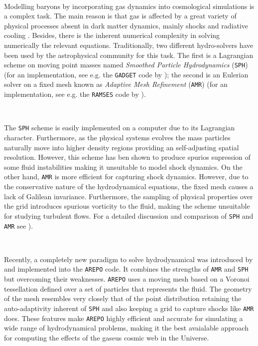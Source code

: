 \documentclass[a4,useAMS,usenatbib,usegraphicx,12pt]{article}
\begin{document}
\

Modelling baryons by incorporating gas dynamics into cosmological
simulations is a complex task. The main reason is that gas is
affected by a great variety of physical processes absent in dark
matter dynamics, mainly shocks and radiative cooling
\citep{Bond93}. Besides, there is the inherent numerical complexity in
solving numerically the relevant equations. Traditionally, two
different hydro-solvers have been used by the astrophysical community
for this task. The first is a Lagrangian scheme on moving point masses
named \textit{Smoothed
  Particle Hydrodynamics} (\texttt{SPH}) \citep{Monaghan92} (for an
implementation, see e.g. the \texttt{GADGET} code by
\citet{Springel05}); the second is an Eulerian solver on a fixed mesh
known as \textit{ Adaptive Mesh Refinement} (\texttt{AMR})
\citep{Berger89} (for an implementation,  see e.g. the \texttt{RAMSES}
code by \citet{Teyssier02}).  

\

The \texttt{SPH} scheme is easily implemented on a computer due to its 
Lagrangian character. Furthermore, as the physical systems evolves the
mass particles naturally move into higher density regions providing an
self-adjusting spatial resolution. However, this scheme has ben shown
to produce spurios supression of some fluid instabilities making it
unsuitable to model shock dynamics. 
On the other hand, \texttt{AMR} is more efficient 
for capturing shock dynamics. However, due to the conservative nature of the 
hydrodynamical equations, the fixed mesh causes a lack of Galilean
invariance. Furthermore, the sampling of physical properties over the
grid introduces spurious vorticity to the fluid, making the scheme
unsuitable for studying turbulent flows. For a detailed  discussion
and comparison of \texttt{SPH} and \texttt{AMR} see \citet{Plewa01}).

\

Recently, a completely new paradigm to solve hydrodynamical was introduced by
\citet{Springel10} and  implemented into the \texttt{AREPO} code. It
combines the strengths of  \texttt{AMR} and \texttt{SPH} but
overcoming their weaknesses. \texttt{AREPO} uses a moving mesh based
on a Voronoi tessellation defined over a set of particles that represents the fluid. The geometry of the mesh resembles very closely that 
of the point distribution retaining the auto-adaptivity inherent of
\texttt{SPH} and also keeping a grid to capture shocks like
\texttt{AMR} does. These features make \texttt{AREPO} highly 
efficient and accurate for simulating a wide range of hydrodynamical
problems, making it the best avaialable approach for computing the
effects of the gaseus cosmic web in the Universe.
\end{document}
